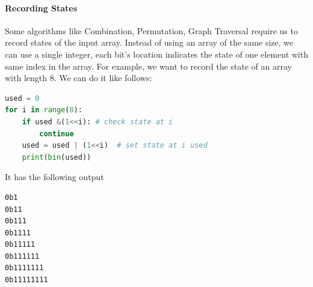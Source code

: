 \documentclass[../main.tex]{subfiles}
\begin{document}
\paragraph{Recording States} Some algorithms like Combination, Permutation,  Graph Traversal require us to record states of the input array. Instead of using an array of the same size, we can use a single integer, each bit's location indicates the state of one element with same index in the array. For example, we want to record the state of an array with length 8. We can do it like follows: 
\begin{lstlisting}[language=Python]
used = 0
for i in range(8):
    if used &(1<<i): # check state at i
        continue
    used = used | (1<<i)  # set state at i used
    print(bin(used))
\end{lstlisting}
It has the following output
\begin{lstlisting}[numbers=none]
0b1
0b11
0b111
0b1111
0b11111
0b111111
0b1111111
0b11111111
\end{lstlisting}
\end{document}
